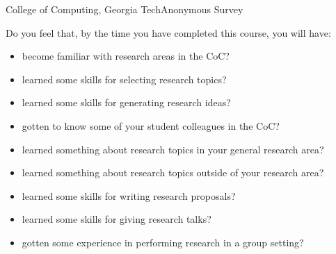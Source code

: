 \documentclass[11pt]{article}
\begin{document}


{College of Computing, Georgia Tech}{Anonymous Survey}

Do you feel that, by the time you have completed this course, you will
have:

\begin{itemize}
\itemsep=0.5in
\item become familiar with research areas in the CoC?
\item learned some skills for selecting research topics?
\item learned some skills for generating research ideas?
\item gotten to know some of your student colleagues in the CoC?
\item learned something about research topics in your general research
  area?
\item learned something about research topics outside of your research
 area?
\item learned some skills for writing research proposals?
\item learned some skills for giving research talks?
\item gotten some experience in performing research in a group setting?
\end{itemize}
\end{document}
